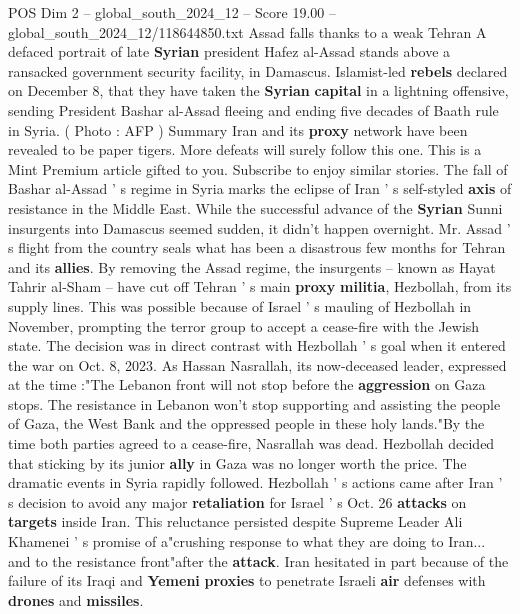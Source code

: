 \begin{textsample}{POS Dim 2 – global\_south\_2024\_12 – Score 19.00 – global\_south\_2024\_12/118644850.txt}  \label{ex:f2_pos_209}
Assad falls thanks to a weak Tehran A defaced portrait of late \textbf{Syrian} president Hafez al-Assad stands above a ransacked government security facility, in Damascus.
Islamist-led \textbf{rebels} declared on December 8, that they have taken the \textbf{Syrian} \textbf{capital} in a lightning offensive, sending President Bashar al-Assad fleeing and ending five decades of Baath rule in Syria. ( Photo : AFP ) Summary Iran and its \textbf{proxy} network have been revealed to be paper tigers.
More defeats will surely follow this one.
This is a Mint Premium article gifted to you.
Subscribe to enjoy similar stories.
The fall of Bashar al-Assad ' s regime in Syria marks the eclipse of Iran ' s self-styled \textbf{axis} of resistance in the Middle East.
While the successful advance of the \textbf{Syrian} Sunni insurgents into Damascus seemed sudden, it didn't happen overnight.
Mr.
Assad ' s flight from the country seals what has been a disastrous few months for Tehran and its \textbf{allies}.
By removing the Assad regime, the insurgents -- known as Hayat Tahrir al-Sham -- have cut off Tehran ' s main \textbf{proxy} \textbf{militia}, Hezbollah, from its supply lines.
This was possible because of Israel ' s mauling of Hezbollah in November, prompting the terror group to accept a cease-fire with the Jewish state.
The decision was in direct contrast with Hezbollah ' s goal when it entered the war on Oct. 8, 2023.
As Hassan Nasrallah, its now-deceased leader, expressed at the time :"The Lebanon front will not stop before the \textbf{aggression} on Gaza stops.
The resistance in Lebanon won't stop supporting and assisting the people of Gaza, the West Bank and the oppressed people in these holy lands."By the time both parties agreed to a cease-fire, Nasrallah was dead.
Hezbollah decided that sticking by its junior \textbf{ally} in Gaza was no longer worth the price.
The dramatic events in Syria rapidly followed.
Hezbollah ' s actions came after Iran ' s decision to avoid any major \textbf{retaliation} for Israel ' s Oct. 26 \textbf{attacks} on \textbf{targets} inside Iran.
This reluctance persisted despite Supreme Leader Ali Khamenei ' s promise of a"crushing response to what they are doing to Iran... and to the resistance front"after the \textbf{attack}.
Iran hesitated in part because of the failure of its Iraqi and \textbf{Yemeni} \textbf{proxies} to penetrate Israeli \textbf{air} defenses with \textbf{drones} and \textbf{missiles}.

\end{textsample}
